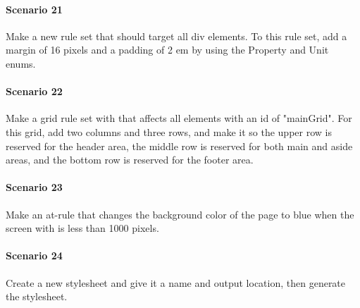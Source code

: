 \documentclass[12pt]{article}
\begin{document}
\paragraph{Scenario 21}
Make a new rule set that should target all div elements. To this rule set, add a margin of 16 pixels and a padding of 2 em by using the Property and Unit enums.

\paragraph{Scenario 22}
Make a grid rule set with that affects all elements with an id of "mainGrid". For this grid, add two columns and three rows, and make it so the upper row is reserved for the header area, the middle row  is reserved for both main and aside areas, and the bottom row is reserved for the footer area.

\paragraph{Scenario 23}
Make an at-rule that changes the background color of the page to blue when the screen with is less than 1000 pixels.

\paragraph{Scenario 24}
Create a new stylesheet and give it a name and output location, then generate the stylesheet.
\end{document}
